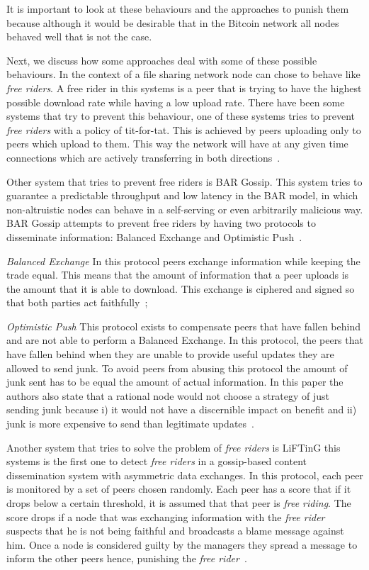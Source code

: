 It is important to look at these behaviours and the approaches to punish them because although it would be desirable that in the Bitcoin network all nodes behaved well that is not the case.

Next, we discuss how some approaches deal with some of these possible behaviours. In the context of a file sharing network node can chose to behave like \textsl{free riders}. A free rider in this systems is a peer that is trying to have the highest possible download rate while having a low upload rate. There have been some systems that try to prevent this behaviour, one of these systems tries to prevent \textit{free riders} with a policy of tit-for-tat. This is achieved by peers uploading only to peers which upload to them. This way the network will have at any given time connections which are actively transferring in both directions~\cite{cohen2003incentives}.

Other system that tries to prevent free riders is BAR Gossip. This system tries to guarantee a predictable throughput and low latency in the BAR model, in which non-altruistic nodes can behave in a self-serving or even arbitrarily malicious way. BAR Gossip attempts to prevent free riders by having two protocols to disseminate information: Balanced Exchange and Optimistic Push~\cite{li2006bar}.

\textsl{Balanced Exchange} In this protocol peers exchange information while keeping the trade equal. This means that the amount of information that a peer uploads is the amount that it is able to download. This exchange is ciphered and signed so that both parties act faithfully~\cite{li2006bar};

\textsl{Optimistic Push} This protocol exists to compensate peers that have fallen behind and are not able to perform a Balanced Exchange. In this protocol, the peers that have fallen behind when they are unable to provide useful updates they are allowed to send junk. To avoid peers from abusing this protocol the amount of junk sent has to be equal the amount of actual information. In this paper the authors also state that a rational node would not choose a strategy of just sending junk because i) it would not have a discernible impact on benefit and ii) junk is more expensive to send than legitimate updates~\cite{li2006bar}.

Another system that tries to solve the problem of \textsl{free riders} is LiFTinG this systems is the first one to detect \textit{free riders} in a gossip-based content dissemination system with asymmetric data exchanges.
In this protocol, each peer is monitored by a set of peers chosen randomly. Each peer has a score that if it drops below a certain threshold, it is assumed that that peer is \textsl{free riding}. The score drops if a node that was exchanging information with the \textsl{free rider} suspects that he is not being faithful and broadcasts a blame message against him. Once a node is considered guilty by the managers they spread a message to inform the other peers hence, punishing the \textsl{free rider}~\cite{guerraoui2010lifting}.


